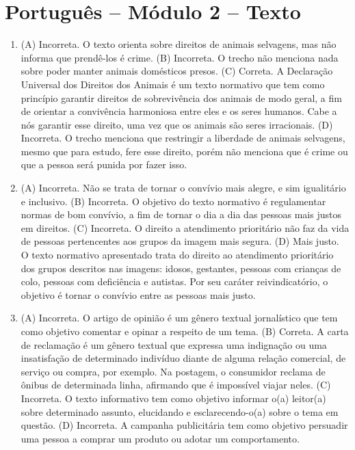 \section*{Português – Módulo 2 – Texto}

\begin{enumerate}
\item (A) Incorreta. O texto orienta sobre direitos de animais selvagens,
mas não informa que prendê-los é crime.
(B) Incorreta. O trecho não menciona nada sobre poder manter animais
domésticos presos.
(C) Correta. A Declaração Universal dos Direitos dos Animais é um texto normativo que
tem como princípio garantir direitos de sobrevivência dos animais de
modo geral, a fim de orientar a convivência harmoniosa entre eles e os
seres humanos. Cabe a nós garantir esse direito, uma vez que os animais
são seres irracionais.
(D) Incorreta. O trecho menciona que restringir a liberdade de animais
selvagens, mesmo que para estudo, fere esse direito, porém não menciona
que é crime ou que a pessoa será punida por fazer isso.

\item (A) Incorreta. Não se trata de tornar o convívio mais alegre, e sim
igualitário e inclusivo.
(B) Incorreta. O objetivo do texto normativo é regulamentar normas de
bom convívio, a fim de tornar o dia a dia das pessoas mais justos em
direitos.
(C) Incorreta. O direito a atendimento prioritário não faz da vida de
pessoas pertencentes aos grupos da imagem mais segura.
(D) Mais justo. O texto normativo apresentado trata do direito ao atendimento
prioritário dos grupos descritos nas imagens: idosos, gestantes, pessoas
com crianças de colo, pessoas com deficiência e autistas. Por seu
caráter reivindicatório, o objetivo é tornar o convívio entre as pessoas
mais justo.

\item (A) Incorreta. O artigo de opinião é um gênero textual jornalístico que
tem como objetivo comentar e opinar a respeito de um tema.
(B) Correta. A carta de reclamação é um gênero textual que expressa uma indignação ou
uma insatisfação de determinado indivíduo diante de alguma relação
comercial, de serviço ou compra, por exemplo. Na postagem, o consumidor
reclama de ônibus de determinada linha, afirmando que é impossível
viajar neles.
(C) Incorreta. O texto informativo tem como objetivo informar o(a)
leitor(a) sobre determinado assunto, elucidando e esclarecendo-o(a)
sobre o tema em questão.
(D) Incorreta. A campanha publicitária tem como objetivo persuadir uma
pessoa a comprar um produto ou adotar um comportamento.
\end{enumerate}

